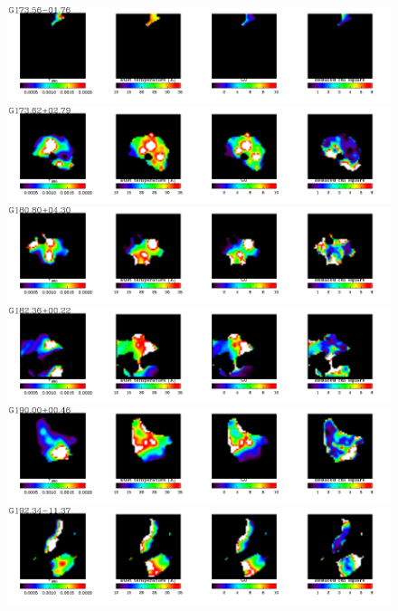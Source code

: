   \begin{figure}
\centering
\includegraphics[trim=0 2mm 0 0, clip, width=190mm]{appA/appA_42.pdf}
\includegraphics[trim=0 2mm 0 0, clip, width=190mm]{appA/appA_43.pdf}
\includegraphics[trim=0 2mm 0 0, clip, width=190mm]{appA/appA_44.pdf}
\includegraphics[trim=0 2mm 0 0, clip, width=190mm]{appA/appA_45.pdf}
\includegraphics[trim=0 2mm 0 0, clip, width=190mm]{appA/appA_46.pdf}
\includegraphics[trim=0 2mm 0 0, clip, width=190mm]{appA/appA_47.pdf}
  \end{figure}
  
